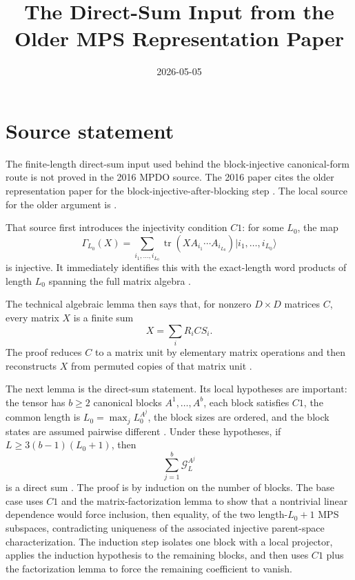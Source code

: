 \documentclass{article}
\title{The Direct-Sum Input from the Older MPS Representation Paper}
\author{}
\date{2026-05-05}
\begin{document}
\maketitle

\section{Source statement}

The finite-length direct-sum input used behind the block-injective
canonical-form route is not proved in the 2016 MPDO source. The 2016 paper
cites the older representation paper for the block-injective-after-blocking
step \cite[lines~340--345]{Cirac2016MPDO_arXiv}. The local source for the
older argument is .

That source first introduces the injectivity condition $C1$: for some
$L_0$, the map
\[
  \Gamma_{L_0}(X) = \sum_{i_1,\ldots,i_{L_0}}
      \operatorname{tr}(X A_{i_1}\cdots A_{i_{L_0}})
      |i_1,\ldots,i_{L_0}\rangle
\]
is injective. It immediately identifies this with the exact-length word
products of length $L_0$ spanning the full matrix algebra
\cite[lines~888--908]{PerezGarcia2007MPSReps}.

The technical algebraic lemma then says that, for nonzero $D\times D$
matrices $C$, every matrix $X$ is a finite sum
\[
  X = \sum_i R_i C S_i.
\]
The proof reduces $C$ to a matrix unit by elementary matrix operations and
then reconstructs $X$ from permuted copies of that matrix unit
\cite[lines~1333--1344]{PerezGarcia2007MPSReps}.

The next lemma is the direct-sum statement. Its local hypotheses are important:
the tensor has $b \ge 2$ canonical blocks $A^1,\ldots,A^b$, each block
satisfies $C1$, the common length is
$L_0=\max_j L_0^{A^j}$, the block sizes are ordered, and the block states are
assumed pairwise different
\cite[lines~1321--1330]{PerezGarcia2007MPSReps}. Under these hypotheses, if
$L \ge 3(b-1)(L_0+1)$, then
\[
  \sum_{j=1}^b \mathcal G_L^{A^j}
\]
is a direct sum \cite[lines~1346--1408]{PerezGarcia2007MPSReps}. The proof is
by induction on the number of blocks. The base case uses $C1$ and the
matrix-factorization lemma to show that a nontrivial linear dependence would
force inclusion, then equality, of the two length-$L_0+1$ MPS subspaces,
contradicting uniqueness of the associated injective parent-space
characterization. The induction step isolates one block with a local
projector, applies the induction hypothesis to the remaining blocks, and then
uses $C1$ plus the factorization lemma to force the remaining coefficient to
vanish.
\end{document}
